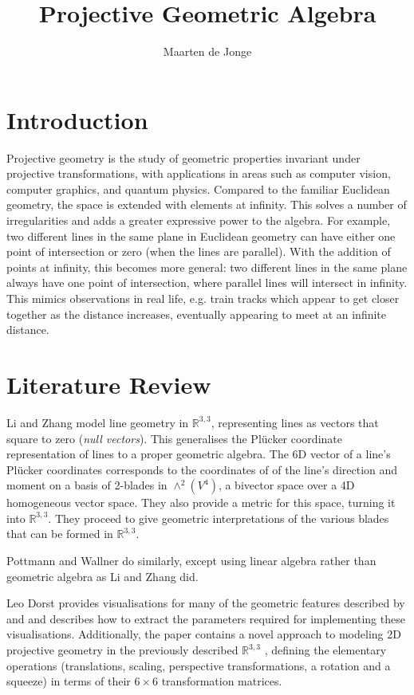 \documentclass[a4paper, 10pt]{article}
\author{Maarten de Jonge}
\title{Projective Geometric Algebra}
\begin{document}
\newcommand{\rp}{$\mathbb{R}^{3,3}$ }

\maketitle

\section{Introduction}
Projective geometry is the study of geometric properties invariant under
projective transformations, with applications in areas such as computer vision,
computer graphics, and quantum physics. Compared to the familiar Euclidean
geometry, the space is extended with elements at infinity. This solves a number
of irregularities and adds a greater expressive power to the algebra. For
example, two different lines in the same plane in Euclidean geometry can have
either one point of intersection or zero (when the lines are parallel). With the
addition of points at infinity, this becomes more general: two different lines
in the same plane always have one point of intersection, where parallel lines
will intersect in infinity. This mimics observations in real life, e.g. train
tracks which appear to get closer together as the distance increases,
eventually appearing to meet at an infinite distance.

\section{Literature Review}
Li and Zhang\cite{hangbo2011} model line geometry in $\mathbb{R}^{3,3}$,
representing lines as vectors that square to zero (\emph{null vectors}). This
generalises the Pl\"{u}cker coordinate representation of lines to a proper
geometric algebra. The 6D vector of a line's Pl\"{u}cker coordinates corresponds
to the coordinates of of the line's direction and moment on a basis of 2-blades
in $\wedge^2(V^4)$, a bivector space over a 4D homogeneous vector space. They
also provide a metric for this space, turning it into $\mathbb{R}^{3, 3}$.
They proceed to give geometric interpretations of the various blades that can
be formed in $\mathbb{R}^{3, 3}$.

Pottmann and Wallner\cite{pottmann2001computational} do similarly, except using
linear algebra rather than geometric algebra as Li and Zhang did.

Leo Dorst\cite{dorst2013versors} provides visualisations for many of the
geometric features described by \cite{hangbo2011} and
\cite{pottmann2001computational} and describes how to extract the parameters
required for implementing these visualisations. Additionally, the paper contains
a novel approach to modeling 2D projective geometry in the previously described
\rp, defining the elementary operations (translations, scaling, perspective
transformations, a rotation and a squeeze) in terms of their $6 \times 6$
transformation matrices.
\end{document}
